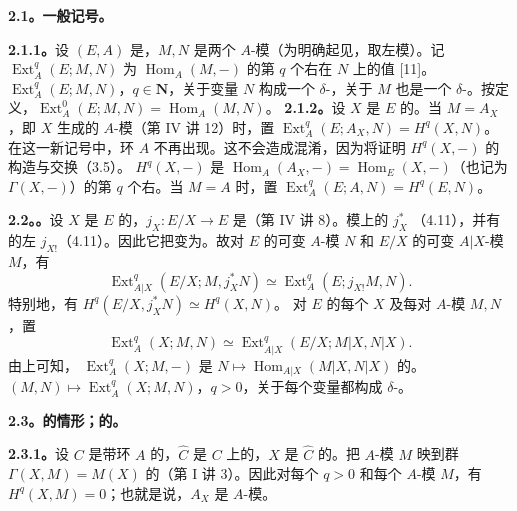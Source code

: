 \textbf{2.1。一般记号。}

\textbf{2.1.1。}设 $(E,A)$ 是，$M,N$ 是两个 $A$-模（为明确起见，取左模）。记 $\operatorname{Ext}_A^q(E;M,N)$ 为 $\operatorname{Hom}_A(M,-)$ 的第 $q$ 个右在 $N$ 上的值 [11]。 $\operatorname{Ext}_A^q(E;M,N)$，$q\in\mathbf N$，关于变量 $N$ 构成一个 $\delta$-，关于 $M$ 也是一个 $\delta$-。按定义，$\operatorname{Ext}_A^0(E;M,N)=\operatorname{Hom}_A(M,N)$。
\textbf{2.1.2。}设 $X$ 是 $E$ 的。当 $M=A_X$，即 $X$ 生成的 $A$-模（第 IV 讲 12）时，置
$\operatorname{Ext}_A^q(E;A_X,N)=H^q(X,N)$。在这一新记号中，环 $A$ 不再出现。这不会造成混淆，因为将证明 $H^q(X,-)$ 的构造与交换（3.5）。 $H^q(X,-)$ 是 $\operatorname{Hom}_A(A_X,-)=\operatorname{Hom}_E(X,-)$（也记为 $\Gamma(X,-)$）的第 $q$ 个右。当 $M=A$ 时，置 $\operatorname{Ext}_A^q(E;A,N)=H^q(E,N)$。

\textbf{2.2。。}设 $X$ 是 $E$ 的，$j_X:E/X\to E$ 是（第 IV 讲 8）。模上的 $j_X^*$ （4.11），并有的左 $j_{X!}$（4.11）。因此它把变为。故对 $E$ 的可变 $A$-模 $N$ 和 $E/X$ 的可变 $A|X$-模 $M$，有
\[
 \operatorname{Ext}_{A|X}^q(E/X;M,j_X^*N)
 \simeq\operatorname{Ext}_A^q(E;j_{X!}M,N).\tag{2.2.1}
\]
特别地，有 $H^q(E/X,j_X^*N)\simeq H^q(X,N)$。
对 $E$ 的每个 $X$ 及每对 $A$-模 $M,N$，置
\[
 \operatorname{Ext}_A^q(X;M,N)\simeq
 \operatorname{Ext}_{A|X}^q(E/X;M|X,N|X).\tag{2.2.2}
\]
由上可知， $\operatorname{Ext}_A^q(X;M,-)$ 是 $N\mapsto\operatorname{Hom}_{A|X}(M|X,N|X)$ 的。 $(M,N)\mapsto\operatorname{Ext}_A^q(X;M,N)$，$q>0$，关于每个变量都构成 $\delta$-。

\textbf{2.3。的情形；的。}

\textbf{2.3.1。}设 $C$ 是带环 $A$ 的，$\widehat C$ 是 $C$ 上的，$X$ 是 $\widehat C$ 的。把 $A$-模 $M$ 映到群 $\Gamma(X,M)=M(X)$ 的（第 I 讲 3）。因此对每个 $q>0$ 和每个 $A$-模 $M$，有 $H^q(X,M)=0$；也就是说，$A_X$ 是 $A$-模。

